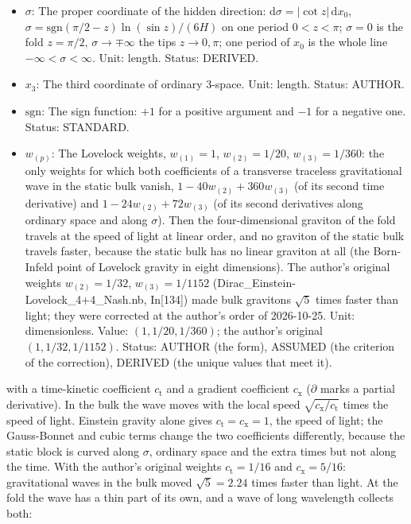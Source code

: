 \documentclass[
  10pt,
]{article}
\begin{document}
\begin{itemize}
\item
  \(\sigma\): The proper coordinate of the hidden direction:
  \(\mathrm{d}\sigma = \lvert\cot z\rvert\,\mathrm{d}x_0\),
  \(\sigma = \mathrm{sgn}(\pi/2 - z)\ln(\sin z)/(6H)\) on one period
  \(0 < z < \pi\); \(\sigma = 0\) is the fold \(z = \pi/2\),
  \(\sigma \to \mp\infty\) the tips \(z \to 0, \pi\); one period of
  \(x_0\) is the whole line \(-\infty < \sigma < \infty\). Unit: length.
  Status: DERIVED.
\item
  \(x_3\): The third coordinate of ordinary 3-space. Unit: length.
  Status: AUTHOR.
\item
  \(\mathrm{sgn}\): The sign function: \(+1\) for a positive argument
  and \(-1\) for a negative one. Status: STANDARD.
\item
  \(w_{(p)}\): The Lovelock weights, \(w_{(1)} = 1\),
  \(w_{(2)} = 1/20\), \(w_{(3)} = 1/360\): the only weights for which
  both coefficients of a transverse traceless gravitational wave in the
  static bulk vanish, \(1 - 40w_{(2)} + 360w_{(3)}\) (of its second time
  derivative) and \(1 - 24w_{(2)} + 72w_{(3)}\) (of its second
  derivatives along ordinary space and along \(\sigma\)). Then the
  four-dimensional graviton of the fold travels at the speed of light at
  linear order, and no graviton of the static bulk travels faster,
  because the static bulk has no linear graviton at all (the Born-Infeld
  point of Lovelock gravity in eight dimensions). The author's original
  weights \(w_{(2)} = 1/32\), \(w_{(3)} = 1/1152\)
  (Dirac\_Einstein-Lovelock\_4+4\_Nash.nb, In{[}134{]}) made bulk
  gravitons \(\sqrt5\) times faster than light; they were corrected at
  the author's order of 2026-10-25. Unit: dimensionless. Value:
  \((1, 1/20, 1/360)\); the author's original \((1, 1/32, 1/1152)\).
  Status: AUTHOR (the form), ASSUMED (the criterion of the correction),
  DERIVED (the unique values that meet it).
\end{itemize}

with a time-kinetic coefficient \(c_{\mathrm{t}}\) and a gradient
coefficient \(c_{\mathrm{x}}\) (\(\partial\) marks a partial
derivative). In the bulk the wave moves with the local speed
\(\sqrt{c_{\mathrm{x}}/c_{\mathrm{t}}}\) times the speed of light.
Einstein gravity alone gives \(c_{\mathrm{t}} = c_{\mathrm{x}} = 1\),
the speed of light; the Gauss-Bonnet and cubic terms change the two
coefficients differently, because the static block is curved along
\(\sigma\), ordinary space and the extra times but not along the time.
With the author's original weights \(c_{\mathrm{t}} = 1/16\) and
\(c_{\mathrm{x}} = 5/16\): gravitational waves in the bulk moved
\(\sqrt5 = 2.24\) times faster than light. At the fold the wave has a
thin part of its own, and a wave of long wavelength collects both:
\end{document}
